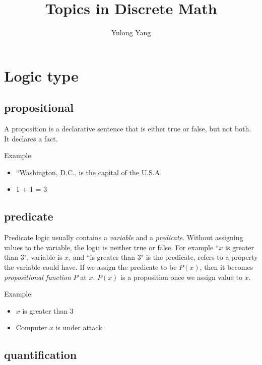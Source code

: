 \documentclass[11pt, oneside]{article}   	%
\title{Topics in Discrete Math}
\author{Yulong Yang}
\begin{document}
\maketitle

\section{Logic type}

\subsection{propositional}

A proposition is a declarative sentence that is either true or false, but not both. It declares a fact.

Example:

\begin{itemize}
\item ``Washington, D.C., is the capital of the U.S.A.
\item 1 + 1 = 3
\end{itemize}

\subsection{predicate}

Predicate logic usually contains a \textit{variable} and a \textit{predicate}. Without assigning values to the variable, the logic is neither true or false. For example ``$x$ is greater than 3", variable is $x$, and ``is greater than 3" is the predicate, refers to a property the variable could have. If we assign the predicate to be $P(x)$, then it becomes \textit{propositional function} $P$ at $x$. $P(x)$ is a proposition once we assign value to $x$.

Example:
\begin{itemize}
\item $x$ is greater than 3
\item Computer $x$ is under attack
\end{itemize}

\subsection{quantification}
\end{document}

